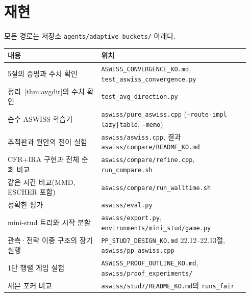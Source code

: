 \section{재현}\label{app:repro}
모든 경로는 저장소 \texttt{agents/adaptive\_buckets/} 아래다.
\begin{table}[h]
\centering\small
\begin{tabular}{@{}p{0.36\linewidth}p{0.58\linewidth}@{}}
\toprule
내용 & 위치 \\
\midrule
5절의 증명과 수치 확인 & \texttt{ASWISS\_CONVERGENCE\_KO.md}, \texttt{test\_aswiss\_convergence.py} \\
정리~\ref{thm:avgdir}의 수치 확인 & \texttt{test\_avg\_direction.py} \\
순수 ASWISS 학습기 & \texttt{aswiss/pure\_aswiss.cpp} (\texttt{--route-impl lazy|table}, \texttt{--memo}) \\
추적판과 원안의 전이 실험 & \texttt{aswiss/aswiss.cpp}, 결과 \texttt{aswiss/compare/README\_KO.md} \\
CFR+IRA 구현과 전체 순회 비교 & \texttt{aswiss/compare/refine.cpp}, \texttt{run\_compare.sh} \\
같은 시간 비교(MMD, ESCHER 포함) & \texttt{aswiss/compare/run\_walltime.sh} \\
정확한 평가 & \texttt{aswiss/eval.py} \\
mini-stud 트리와 시작 분할 & \texttt{aswiss/export.py}, \texttt{environments/mini\_stud/game.py} \\
관측·전략 이중 구조의 장기 실행 & \texttt{PP\_STUD7\_DESIGN\_KO.md} 22.12–22.13절, \texttt{aswiss/pp\_aswiss.cpp} \\
1단 행렬 게임 실험 & \texttt{ASWISS\_PROOF\_OUTLINE\_KO.md}, \texttt{aswiss/proof\_experiments/} \\
세븐 포커 비교 & \texttt{aswiss/stud7/README\_KO.md}의 \texttt{runs\_fair} \\
\bottomrule
\end{tabular}
\end{table}

